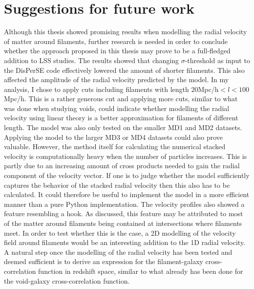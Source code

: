 \section{Suggestions for future work}\label{sec:futurework}
Although this thesis showed promising results when modelling the radial velocity of matter around filaments, further research is needed in order to conclude whether the approach proposed in this thesis may prove to be a full-fledged addition to LSS studies. The results showed that changing $\sigma$-threshold as input to the DisPerSE code effectively lowered the amount of shorter filaments. This also affected the amplitude of the radial velocity predicted by the model. In my analysis, I chose to apply cuts including filaments with length $20$Mpc/h$<l<100$Mpc/h. This is a rather generous cut and applying more cuts, similar to what was done when studying voids, could indicate whether modelling the radial velocity using linear theory is a better approximation for filaments of different length. The model was also only tested on the smaller MD1 and MD2 datasets. Applying the model to the larger MD3 or MD4 datasets could also prove valuable. However, the method itself for calculating the numerical stacked velocity is computationally heavy when the number of particles increases. This is partly due to an increasing amount of cross products needed to gain the radial component of the velocity vector. If one is to judge whether the model sufficiently captures the behavior of the stacked radial velocity then this also has to be calculated. It could therefore be useful to implement the model in a more efficient manner than a pure Python implementation. The velocity profiles also showed a feature resembling a hook. As discussed, this feature may be attributed to most of the matter around filaments being contained at intersections where filaments meet. In order to test whether this is the case, a 2D modelling of the velocity field around filaments would be an interesting addition to the 1D radial velocity. A natural step once the modelling of the radial velocity has been tested and deemed sufficient is to derive an expression for the filament-galaxy cross-correlation function in redshift space, similar to what already has been done for the void-galaxy cross-correlation function.\\\indent
